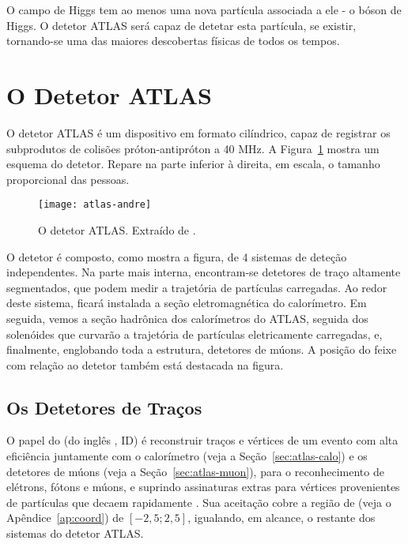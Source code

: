 O campo de Higgs tem ao menos uma nova partícula associada a ele - o bóson de
Higgs. O detetor ATLAS será capaz de detetar esta partícula, se existir,
tornando-se uma das maiores descobertas físicas de todos os tempos.

\section{O Detetor ATLAS}

O detetor ATLAS é um dispositivo em formato cilíndrico, capaz de registrar os
subprodutos de colisões próton-antipróton a 40 MHz. A
Figura~\ref{fig:atlas-scheme} mostra um esquema do detetor. Repare na parte
inferior à direita, em escala, o tamanho proporcional das pessoas.

\begin{figure}
\begin{center}
\texttt{[image: atlas-andre]}
\end{center}
\caption{O detetor ATLAS. Extraído de \cite{cern}.}
\label{fig:atlas-scheme}
\end{figure}

O detetor  é composto, como mostra a figura, de 4 sistemas de
deteção independentes. Na parte mais interna, encontram-se detetores de traço
altamente segmentados, que podem medir a trajetória de partículas
carregadas. Ao redor deste sistema, ficará instalada a seção eletromagnética
do calorímetro. Em seguida, vemos a seção hadrônica dos calorímetros do ATLAS,
seguida dos solenóides que curvarão a trajetória de partículas eletricamente
carregadas, e, finalmente, englobando toda a estrutura, detetores de múons. A
posição do feixe com relação ao detetor também está destacada na figura.

\subsection{Os Detetores de Traços}
\label{sec:atlas-id}

O papel do  (do inglês , ID) é
reconstruir traços e vértices de um evento com alta eficiência juntamente com
o calorímetro (veja a Seção~\ref{sec:atlas-calo}) e os detetores de múons
(veja a Seção~\ref{sec:atlas-muon}), para o reconhecimento de elétrons, fótons
e múons, e suprindo assinaturas extras para vértices provenientes de partículas
que decaem rapidamente \cite{atlas-id-tdr}. Sua aceitação cobre a região de
 (veja o Apêndice~\ref{ap:coord}) de $[-2,5; 2,5]$,
igualando, em alcance, o restante dos sistemas do detetor ATLAS.

